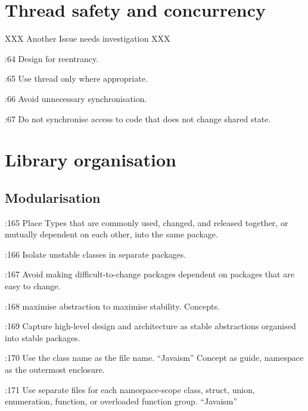 \documentclass{book}
\begin{document}
\chapter{Thread safety and concurrency} 
\label{cha:Threads}

XXX Another Issue needs investigation XXX
 
\cite{OKL_MisfeldtBumgardnerGray2004CppStyle}:64 Design for reentrancy.

\cite{OKL_MisfeldtBumgardnerGray2004CppStyle}:65 Use thread only where appropriate. 

\cite{OKL_MisfeldtBumgardnerGray2004CppStyle}:66 Avoid unnecessary synchronisation.

\cite{OKL_MisfeldtBumgardnerGray2004CppStyle}:67 Do not synchronise access to code that does not change shared state.





\chapter{Library organisation}
\label{sec:LibOrganization}

\section{Modularisation}
\label{sec:Modularisation}

\cite{OKL_MisfeldtBumgardnerGray2004CppStyle}:165 Place Types that are commonly used, changed, and released together, or mutually dependent on each other, into the same package. 

\cite{OKL_MisfeldtBumgardnerGray2004CppStyle}:166 Isolate unstable classes in separate packages.

\cite{OKL_MisfeldtBumgardnerGray2004CppStyle}:167 Avoid making difficult-to-change packages dependent on packages that are easy to change.

\cite{OKL_MisfeldtBumgardnerGray2004CppStyle}:168 maximise abstraction to maximise stability. Concepts.

\cite{OKL_MisfeldtBumgardnerGray2004CppStyle}:169 Capture high-level design and architecture as stable abstractions organised into stable packages.

\cite{OKL_MisfeldtBumgardnerGray2004CppStyle}:170 Use the class name as the file name. ``Javaism'' Concept as guide, namespace as the outermost enclosure.

\cite{OKL_MisfeldtBumgardnerGray2004CppStyle}:171 Use separate files for each namespace-scope class, struct, union, enumeration, function, or overloaded function group. ``Javaism''
\end{document}
